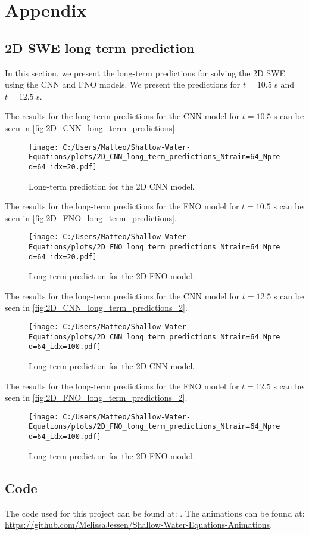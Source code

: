 \appendix
\chapter{Appendix}

\section{2D SWE long term prediction}\label{app:2D_SWE_long_term_prediction}
In this section, we present the long-term predictions for solving the 2D SWE using the CNN and FNO models.
We present the predictions for $t = 10.5$ s and $t = 12.5$ s.

The results for the long-term predictions for the CNN model for $t = 10.5$ s can be seen in \autoref{fig:2D_CNN_long_term_predictions}.
\begin{figure}[H]
    \centering
    \texttt{[image: C:/Users/Matteo/Shallow-Water-Equations/plots/2D\_CNN\_long\_term\_predictions\_Ntrain=64\_Npred=64\_idx=20.pdf]}
    \caption{Long-term prediction for the 2D CNN model.}\label{fig:2D_CNN_long_term_predictions}
\end{figure}

The results for the long-term predictions for the FNO model for $t= 10.5$ s can be seen in \autoref{fig:2D_FNO_long_term_predictions}.
\begin{figure}[H]
    \centering
    \texttt{[image: C:/Users/Matteo/Shallow-Water-Equations/plots/2D\_FNO\_long\_term\_predictions\_Ntrain=64\_Npred=64\_idx=20.pdf]}
    \caption{Long-term prediction for the 2D FNO model.}\label{fig:2D_FNO_long_term_predictions}
\end{figure}

The results for the long-term predictions for the CNN model for $t= 12.5$ s can be seen in \autoref{fig:2D_CNN_long_term_predictions_2}.
\begin{figure}[H]
    \centering
    \texttt{[image: C:/Users/Matteo/Shallow-Water-Equations/plots/2D\_CNN\_long\_term\_predictions\_Ntrain=64\_Npred=64\_idx=100.pdf]}
    \caption{Long-term prediction for the 2D CNN model.}\label{fig:2D_CNN_long_term_predictions_2}
\end{figure}

The results for the long-term predictions for the FNO model for $t= 12.5$ s can be seen in \autoref{fig:2D_FNO_long_term_predictions_2}.
\begin{figure}[H]
    \centering
    \texttt{[image: C:/Users/Matteo/Shallow-Water-Equations/plots/2D\_FNO\_long\_term\_predictions\_Ntrain=64\_Npred=64\_idx=100.pdf]}
    \caption{Long-term prediction for the 2D FNO model.}\label{fig:2D_FNO_long_term_predictions_2}
\end{figure}


\section{Code}
The code used for this project can be found at: \cite{Github_SWE}.
The animations can be found at: \url{https://github.com/MelissaJessen/Shallow-Water-Equations-Animations}.

